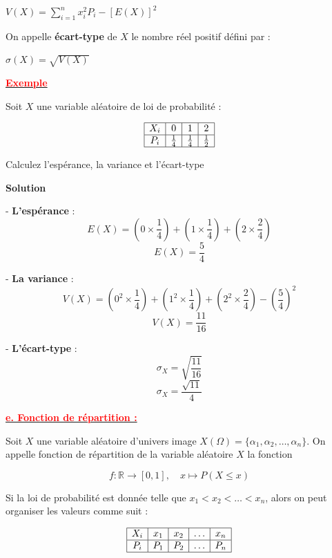 \documentclass[12pt,a4paper]{article}
\begin{document}
\vspace{0.5em}

\begin{center}
    \underline{\color{red} $V(X) = \displaystyle \sum_{i=1}^{n} x_i^2 P_i - [E(X)]^2$}
\end{center}

\vspace{1em}

On appelle \textbf{écart-type} de $X$ le nombre réel positif défini par :
\begin{center}
    \underline{\color{red} $\sigma(X) = \sqrt{V(X)}$}
\end{center}

\underline{\textbf{\textcolor{red}{Exemple}}}

Soit \( X \) une variable aléatoire de loi de probabilité :

\[
\begin{array}{|c|c|c|c|}
\hline
X_i & 0 & 1 & 2 \\
\hline
P_i & \frac{1}{4} & \frac{1}{4} & \frac{1}{2} \\
\hline
\end{array}
\]

 Calculez l'espérance, la variance et l'écart-type

\textbf{Solution}

- \textbf{L'espérance} : 
\[
E(X) = \left(0 \times \frac{1}{4}\right) + \left(1 \times \frac{1}{4}\right) + \left(2 \times \frac{2}{4}\right)
\]
\[
E(X) = \frac{5}{4}
\]

- \textbf{La variance} : 
\[
V(X) = \left(0^2 \times \frac{1}{4}\right) + \left(1^2 \times \frac{1}{4}\right) + \left(2^2 \times \frac{2}{4}\right) - \left(\frac{5}{4}\right)^2
\]
\[
V(X) = \frac{11}{16}
\]

- \textbf{L'écart-type} : 
\[
\sigma_X = \sqrt{\frac{11}{16}} 
\]
\[
\sigma_X = \frac{\sqrt{11}}{4}
\]

\underline{\textbf{\textcolor{red}{e. Fonction de répartition :}}}

Soit \( X \) une variable aléatoire d'univers image \( X(\Omega) = \{ \alpha_1, \alpha_2, \dots, \alpha_n \} \). On appelle fonction de répartition de la variable aléatoire \( X \) la fonction

\[
f : \mathbb{R} \to [0, 1], \quad x \mapsto P(X \leq x)
\]

Si la loi de probabilité est donnée telle que \( x_1 < x_2 < \dots < x_n \), alors on peut organiser les valeurs comme suit :

\[
\begin{array}{|c|c|c|c|c|}
\hline
X_i & x_1 & x_2 & \dots & x_n \\
\hline
P_i & P_1 & P_2 & \dots & P_n \\
\hline
\end{array}
\]
\end{document}
